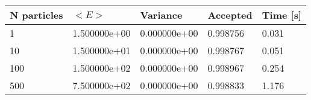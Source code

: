 \begin{table}[h!]
\begin{tabular}{|l|l|l|l|l|}
\hline 
N particles & $<E>$ & Variance & Accepted & Time [s]\\ 
 \hline 
1 & 1.500000e+00 & 0.000000e+00 & 0.998756 & 0.031 \\ \hline 
10 & 1.500000e+01 & 0.000000e+00 & 0.998767 & 0.051 \\ \hline 
100 & 1.500000e+02 & 0.000000e+00 & 0.998967 & 0.254 \\ \hline 
500 & 7.500000e+02 & 0.000000e+00 & 0.998833 & 1.176 \\ \hline 
\end{tabular}
\label{tab:ia3} 
\end{table} 
